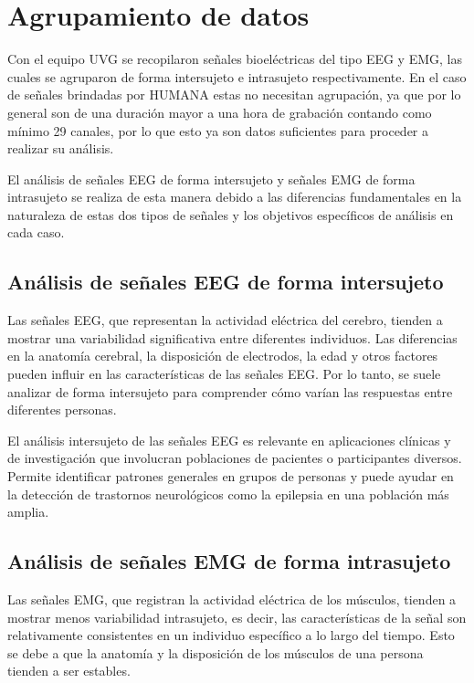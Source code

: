 \section{Agrupamiento de datos}
Con el equipo UVG se recopilaron señales bioeléctricas del tipo EEG y EMG, las cuales se agruparon de forma \gls{intersujeto} e \gls{intrasujeto} respectivamente. En el caso de señales brindadas por HUMANA estas no necesitan agrupación, ya que por lo general son de una duración mayor a una hora de grabación contando como mínimo 29 canales, por lo que esto ya son datos suficientes para proceder a realizar su análisis.

El análisis de señales EEG de forma intersujeto y señales EMG de forma intrasujeto se realiza de esta manera debido a las diferencias fundamentales en la naturaleza de estas dos tipos de señales y los objetivos específicos de análisis en cada caso.

\subsection{Análisis de señales EEG de forma intersujeto}
Las señales EEG, que representan la actividad eléctrica del cerebro, tienden a mostrar una variabilidad significativa entre diferentes individuos. Las diferencias en la anatomía cerebral, la disposición de electrodos, la edad y otros factores pueden influir en las características de las señales EEG. Por lo tanto, se suele analizar de forma intersujeto para comprender cómo varían las respuestas entre diferentes personas.

El análisis intersujeto de las señales EEG es relevante en aplicaciones clínicas y de investigación que involucran poblaciones de pacientes o participantes diversos. Permite identificar patrones generales en grupos de personas y puede ayudar en la detección de trastornos neurológicos como la epilepsia en una población más amplia.

\subsection{Análisis de señales EMG de forma intrasujeto}
Las señales EMG, que registran la actividad eléctrica de los músculos, tienden a mostrar menos variabilidad intrasujeto, es decir, las características de la señal son relativamente consistentes en un individuo específico a lo largo del tiempo. Esto se debe a que la anatomía y la disposición de los músculos de una persona tienden a ser estables.


